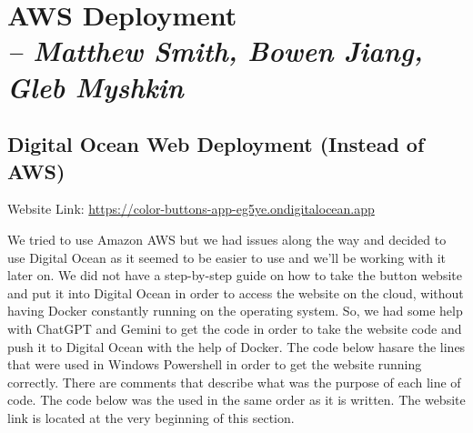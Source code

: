 \chapter{AWS Deployment \\
\small{\textit{-- Matthew Smith, Bowen Jiang, Gleb Myshkin}}}
\label{Chapter::AWS_Deployment}


\section{Digital Ocean Web Deployment (Instead of AWS)}
Website Link: \href {https://color-buttons-app-eg5ye.ondigitalocean.app}{https://color-buttons-app-eg5ye.ondigitalocean.app}

We tried to use Amazon AWS but we had issues along the way and decided to use Digital Ocean as it seemed to be easier to use and we'll be working with it later on. We did not have a step-by-step guide on how to take the button website and put it into Digital Ocean in order to access the website on the cloud, without having Docker constantly running on the operating system. So, we had some help with ChatGPT and Gemini to get the code in order to take the website code and push it to Digital Ocean with the help of Docker. The code below hasare the lines that were used in Windows Powershell in order to get the website running correctly. There are comments that describe what was the purpose of each line of code. The code below was the used in the same order as it is written. The website link is located at the very beginning of this section.

